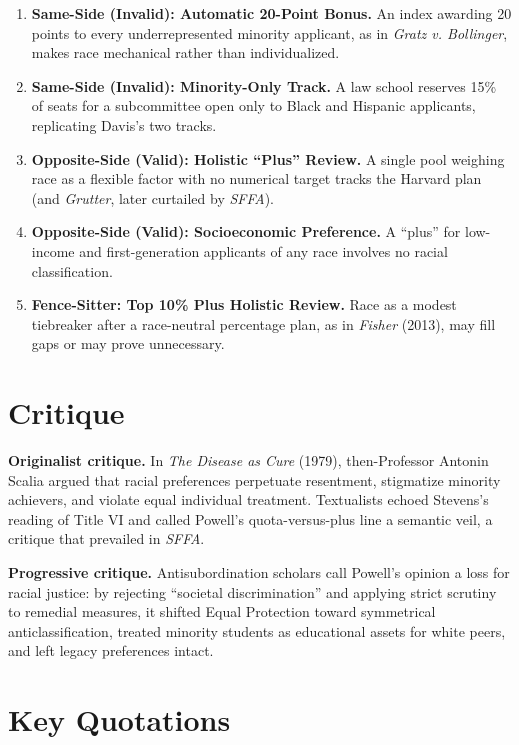 \documentclass[12pt]{article}
\begin{document}
\begin{enumerate}
\item \textbf{Same-Side (Invalid): Automatic 20-Point Bonus.} An index awarding 20 points to every underrepresented minority applicant, as in \textit{Gratz v. Bollinger}, makes race mechanical rather than individualized.
\item \textbf{Same-Side (Invalid): Minority-Only Track.} A law school reserves 15\% of seats for a subcommittee open only to Black and Hispanic applicants, replicating Davis's two tracks.
\item \textbf{Opposite-Side (Valid): Holistic ``Plus'' Review.} A single pool weighing race as a flexible factor with no numerical target tracks the Harvard plan (and \textit{Grutter}, later curtailed by \textit{SFFA}).
\item \textbf{Opposite-Side (Valid): Socioeconomic Preference.} A ``plus'' for low-income and first-generation applicants of any race involves no racial classification.
\item \textbf{Fence-Sitter: Top 10\% Plus Holistic Review.} Race as a modest tiebreaker after a race-neutral percentage plan, as in \textit{Fisher} (2013), may fill gaps or may prove unnecessary.
\end{enumerate}

\section{Critique}

\textbf{Originalist critique.} In \textit{The Disease as Cure} (1979), then-Professor Antonin Scalia argued that racial preferences perpetuate resentment, stigmatize minority achievers, and violate equal individual treatment. Textualists echoed Stevens's reading of Title VI and called Powell's quota-versus-plus line a semantic veil, a critique that prevailed in \textit{SFFA}.

\textbf{Progressive critique.} Antisubordination scholars call Powell's opinion a loss for racial justice: by rejecting ``societal discrimination'' and applying strict scrutiny to remedial measures, it shifted Equal Protection toward symmetrical anticlassification, treated minority students as educational assets for white peers, and left legacy preferences intact.

\section{Key Quotations}
\end{document}
